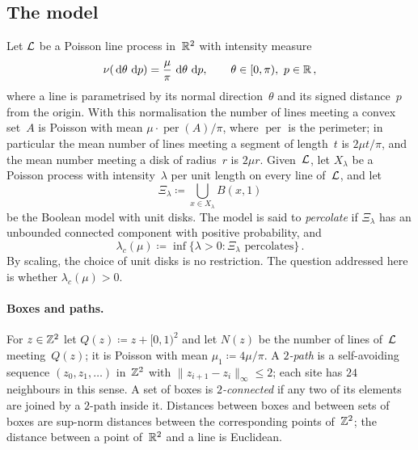 \documentclass[11pt,letterpaper]{article}
\begin{document}
\subsection{The model}

Let $\mathcal L$ be a Poisson line process in~$\mathbb R^2$ with intensity measure
\begin{equation}
\label{eq:nu}
  \nu(\,\mathrm{d}\theta\,\,\mathrm{d} p)=\frac{\mu}{\pi}\,\,\mathrm{d}\theta\,\,\mathrm{d} p,\qquad\theta\in[0,\pi),\ p\in\mathbb R\,,
\end{equation}
where a line is parametrised by its normal direction~$\theta$ and its signed distance~$p$ from the origin. With this normalisation the number of lines meeting a convex set~$A$ is Poisson with mean $\mu\cdot\operatorname{per}(A)/\pi$, where $\operatorname{per}$ is the perimeter; in particular the mean number of lines meeting a segment of length~$t$ is $2\mu t/\pi$, and the mean number meeting a disk of radius~$r$ is $2\mu r$. Given~$\mathcal L$, let $X_\lambda$ be a Poisson process with intensity~$\lambda$ per unit length on every line of~$\mathcal L$, and let
\begin{equation*}
  \Xi_\lambda\coloneqq\bigcup_{x\in X_\lambda}B(x,1)
\end{equation*}
be the Boolean model with unit disks. The model is said to \emph{percolate} if $\Xi_\lambda$ has an unbounded connected component with positive probability, and
\begin{equation*}
  \lambda_c(\mu)\coloneqq\inf\{\lambda>0\colon\Xi_\lambda\text{ percolates}\}\,.
\end{equation*}
By scaling, the choice of unit disks is no restriction. The question addressed here is whether $\lambda_c(\mu)>0$.

\paragraph{Boxes and paths.} For $z\in\mathbb Z^2$ let $Q(z)\coloneqq z+[0,1)^2$ and let $N(z)$ be the number of lines of~$\mathcal L$ meeting~$Q(z)$; it is Poisson with mean $\mu_1\coloneqq4\mu/\pi$. A \emph{$2$-path} is a self-avoiding sequence $(z_0,z_1,\dots)$ in~$\mathbb Z^2$ with $\lVert z_{i+1}-z_i\rVert_\infty\le2$; each site has $24$ neighbours in this sense. A set of boxes is \emph{$2$-connected} if any two of its elements are joined by a $2$-path inside it. Distances between boxes and between sets of boxes are sup-norm distances between the corresponding points of~$\mathbb Z^2$; the distance between a point of~$\mathbb R^2$ and a line is Euclidean.
\end{document}
